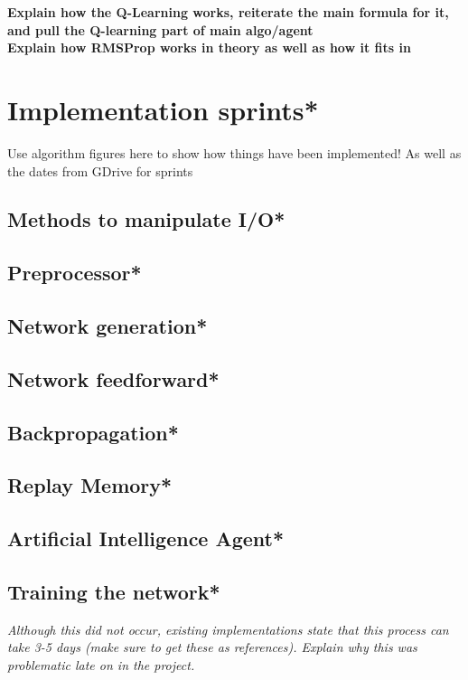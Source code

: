 \documentclass[10pt]{article}
\begin{document}
		\textbf{Explain how the Q-Learning works, reiterate the main formula for it, and pull the Q-learning part of main algo/agent}\\
		
		\textbf{Explain how RMSProp works in theory as well as how it fits in}
	
	\bigskip

\section{Implementation sprints*}
	Use algorithm figures here to show how things have been implemented! As well as the dates from GDrive for sprints
	\subsection{Methods to manipulate I/O*}
	
	\subsection{Preprocessor*}
	
	\subsection{Network generation*}
	
	\subsection{Network feedforward*}
	
	\subsection{Backpropagation*}
	
	\subsection{Replay Memory*}
	
	\subsection{Artificial Intelligence Agent*}
	
	\subsection{Training the network*}
		\textit{Although this did not occur, existing implementations state that this process can take 3-5 days (make sure to get these as references). Explain why this was problematic late on in the project.}
\end{document}
